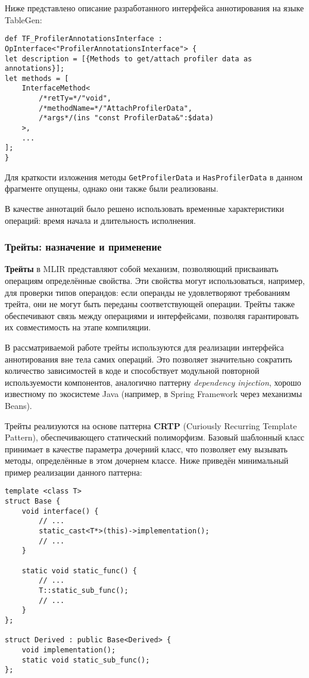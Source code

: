 Ниже представлено описание разработанного интерфейса аннотирования на языке TableGen:

\begin{lstlisting}[caption={Описание интерфейса аннотирования на языке TableGen}]
def TF_ProfilerAnnotationsInterface : OpInterface<"ProfilerAnnotationsInterface"> {
let description = [{Methods to get/attach profiler data as annotations}];
let methods = [
    InterfaceMethod<
        /*retTy=*/"void",
        /*methodName=*/"AttachProfilerData",
        /*args*/(ins "const ProfilerData&":$data)
    >,
    ...
];
}
\end{lstlisting}

Для краткости изложения методы \texttt{GetProfilerData} и \texttt{HasProfilerData} в данном фрагменте опущены, однако они также были реализованы.

В качестве аннотаций было решено использовать временные характеристики операций: время начала и длительность исполнения.

\subsubsection{Трейты: назначение и применение}

\textbf{Трейты} в MLIR представляют собой механизм, позволяющий присваивать операциям определённые свойства. Эти свойства могут использоваться, например, для проверки типов операндов: если операнды не удовлетворяют требованиям трейта, они не могут быть переданы соответствующей операции. Трейты также обеспечивают связь между операциями и интерфейсами, позволяя гарантировать их совместимость на этапе компиляции.

В рассматриваемой работе трейты используются для реализации интерфейса аннотирования вне тела самих операций. Это позволяет значительно сократить количество зависимостей в коде и способствует модульной повторной используемости компонентов, аналогично паттерну \textit{dependency injection}, хорошо известному по экосистеме Java (например, в Spring Framework через механизмы Beans).

Трейты реализуются на основе паттерна \textbf{CRTP} (Curiously Recurring Template Pattern), обеспечивающего статический полиморфизм. Базовый шаблонный класс принимает в качестве параметра дочерний класс, что позволяет ему вызывать методы, определённые в этом дочернем классе. Ниже приведён минимальный пример реализации данного паттерна:

\begin{lstlisting}[caption={Демонстрация принципа CRTP}]
template <class T>
struct Base {
    void interface() {
        // ...
        static_cast<T*>(this)->implementation();
        // ...
    }

    static void static_func() {
        // ...
        T::static_sub_func();
        // ...
    }
};

struct Derived : public Base<Derived> {
    void implementation();
    static void static_sub_func();
};
\end{lstlisting}

